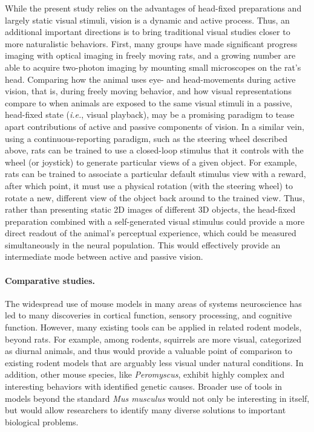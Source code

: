 While the present study relies on the advantages of head-fixed preparations and largely static visual stimuli, vision is a dynamic and active process. Thus, an additional important directions is to bring traditional visual studies closer to more naturalistic behaviors. First, many groups have made significant progress imaging with optical imaging in freely moving rats, and a growing number are able to acquire two-photon imaging by mounting small microscopes on the rat's head. Comparing how the animal uses eye- and head-movements during active vision, that is, during freely moving behavior, and how visual representations compare to when animals are exposed to the same visual stimuli in a passive, head-fixed state (\textit{i.e.}, visual playback), may be a promising paradigm to tease apart contributions of active and passive components of vision. In a similar vein, using a continuous-reporting paradigm, such as the steering wheel described above, rats can be trained to use a closed-loop stimulus that it controls with the wheel (or joystick) to generate particular views of a given object. For example, rats can be trained to associate a particular default stimulus view with a reward, after which point, it must use a physical rotation (with the steering wheel) to rotate a new, different view of the object back around to the trained view. Thus, rather than presenting static 2D images of different 3D objects, the head-fixed preparation combined with a self-generated visual stimulus could provide a more direct readout of the animal's perceptual experience, which could be measured simultaneously in the neural population. This would effectively provide an intermediate mode between active and passive vision.

\paragraph{Comparative studies.}  The widespread use of mouse models in many areas of systems neuroscience has led to many discoveries in cortical function, sensory processing, and cognitive function. However, many existing tools can be applied in related rodent models, beyond rats. For example, among rodents, squirrels\cite{VanHooser2006,Campi2010ComparativeNumber} are more visual, categorized as diurnal animals, and thus would provide a valuable point of comparison to existing rodent models that are arguably less visual under natural conditions. In addition, other mouse species, like \textit{Peromyscus}, exhibit highly complex and interesting behaviors with identified genetic causes\cite{Metz2017,Jourjine2021}. Broader use of tools in models beyond the standard \textit{Mus musculus} would not only be interesting in itself, but would allow researchers to identify many diverse solutions to important biological problems.


